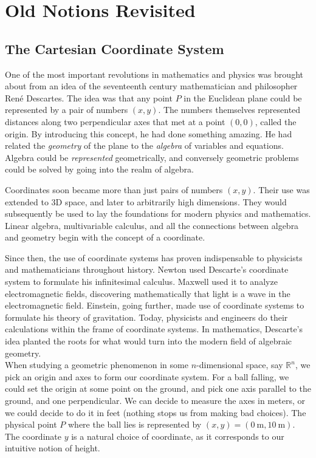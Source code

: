 %
%
% 
%


\chapter{Old Notions Revisited}\thispagestyle{empty}
\section{The Cartesian Coordinate System} %
\label{sec:Cartesian}
	
	One of the most important revolutions in mathematics and physics was brought about from an idea of the seventeenth century mathematician and philosopher Ren\'{e} Descartes. The idea was that any point $P$ in the Euclidean plane could be represented by a pair of numbers $(x,y)$. The numbers themselves represented distances along two perpendicular axes that met at a point $(0,0)$, called the origin. By introducing this concept, he had done something amazing. He had related the \emph{geometry} of the plane to the \emph{algebra} of variables and equations. Algebra could be \emph{represented} geometrically, and conversely geometric problems could be solved by going into the realm of algebra.
	
	
	Coordinates soon became more than just pairs of numbers $(x,y)$. Their use was extended to 3D space, and later to arbitrarily high dimensions. They would subsequently be used to lay the foundations for modern physics and mathematics. Linear algebra, multivariable calculus, and all the connections between algebra and geometry begin with the concept of a coordinate.
	
	Since then, the use of coordinate systems has proven indispensable to physicists and mathematicians throughout history. Newton used Descarte's coordinate system to formulate his infinitesimal calculus. Maxwell used it to analyze electromagnetic fields, discovering mathematically that light is a wave in the electromagnetic field. Einstein, going further, made use of coordinate systems to formulate his theory of gravitation. Today, physicists and engineers do their calculations within the frame of coordinate systems. In mathematics, Descarte's idea planted the roots for what would turn into the modern field of algebraic geometry. \\
	
	When studying a geometric phenomenon in some $n$-dimensional space, say $\mathbb{R}^n$, we pick an origin and axes to form our coordinate system. For a ball falling, we could set the origin at some point on the ground, and pick one axis parallel to the ground, and one perpendicular. We can decide to measure the axes in meters, or we could decide to do it in feet (nothing stops us from making bad choices). The physical point $P$ where the ball lies is represented by $(x,y)=(0~ \mathrm m,10~ \mathrm m)$. The coordinate $y$ is a natural choice of coordinate, as it corresponds to our intuitive notion of height. 
	
